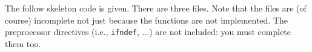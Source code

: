 The follow skeleton code is given. There are three files.
Note that the files are (of course) incomplete not just because the
functions are not implemented.
The preprocessor directives (i.e., \verb!ifndef!, ...) are not included:
you must complete them too.

